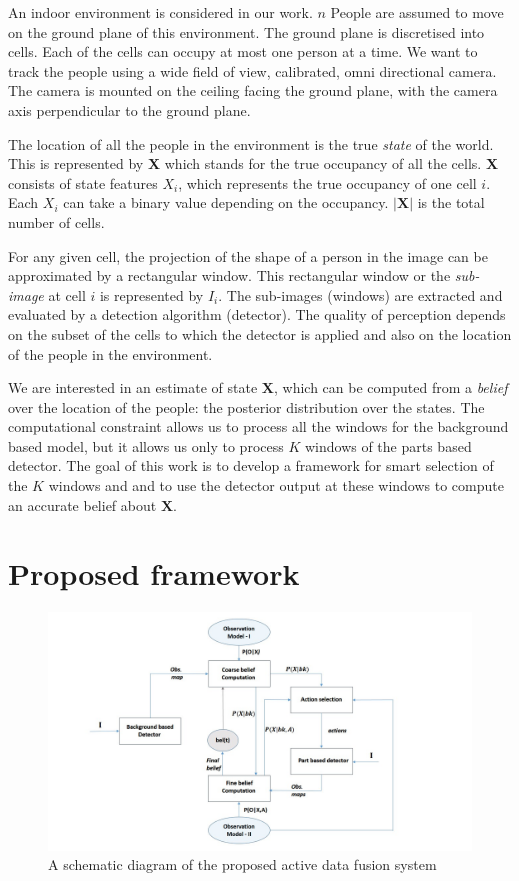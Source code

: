 \documentclass[10pt,twocolumn,letterpaper]{article}
\begin{document}
An indoor environment is considered in our work. $ n$ People are assumed to move on the ground plane of this environment. The ground plane is discretised into cells. Each of the cells can occupy at most one person at a time. We want to track the people using a wide field of view, calibrated, omni directional camera. The camera is mounted on the ceiling facing the ground plane, with the camera axis perpendicular to the ground plane.

The location of all the people in the environment is the true \textit{state} of the world. This is represented by  \textbf{X} which stands for the true occupancy of all the cells. \textbf{X} consists of state features $X_{i}$, which represents the true occupancy of one cell $ i$. Each $X_{i}$ can take a binary value depending on the occupancy. $|\textbf{X}| $ is the total number of cells. 

For any given cell, the projection of the shape of a person in the image can be approximated by a rectangular window. This rectangular window or the \textit{sub-image} at cell $ i $ is represented by $ I_{i} $. The sub-images (windows) are extracted and evaluated by a detection algorithm (detector). The quality of perception depends on the subset of the cells to which the detector is applied and also on the location of the people in the environment.

We are interested in an estimate of state $\textbf{X}$, which can be computed from a \textit{belief} over the location of the people: the posterior distribution over the states.
The computational constraint allows us to process all the windows for the background based model, but it allows us only to process $ K $ windows of the parts based detector. The goal of this work is to develop a framework for smart selection of the $K$ windows and and to use the detector output at these windows to compute an accurate belief about $\textbf{X}$.

\section{Proposed framework}

\begin{figure}
\begin{center}
\includegraphics[width=12cm]{img/newBlockdia.jpg}
\end{center}
   \caption{A schematic diagram of the proposed active data fusion system}
\label{fig:Block dia}
\end{figure}
\end{document}
